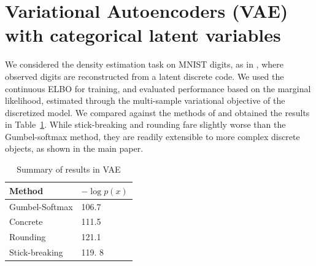 \documentclass[twoside]{article}
\begin{document}
\section{Variational Autoencoders (VAE) with categorical latent variables}



We considered the density estimation task on MNIST digits, as in
\cite{maddison2016concrete, jang2016categorical}, where observed
digits are reconstructed from a latent discrete code. We used the
continuous ELBO for training, and evaluated performance based on the
marginal likelihood, estimated through the multi-sample variational
objective of the discretized model. We compared against the methods of
\cite{jang2016categorical, maddison2016concrete} and obtained the
results in Table~\ref{tab:vae}.  While stick-breaking and rounding
fare slightly worse than the Gumbel-softmax method, they are readily
extensible to more complex discrete objects, as shown in the main
paper.

\begin{table}[h]
  \caption{Summary of results in VAE}
  \label{tab:vae}
  \centering
  \begin{tabular}{ll}
    \textbf{Method} & $- \log p(x)$ \\
    \hline
    Gumbel-Softmax    & 106.7 \\
    Concrete  &  111.5\\
    Rounding &  121.1 \\
    Stick-breaking & 119. 8\\
    \bottomrule
  \end{tabular}
\end{table}


   
\end{document}
